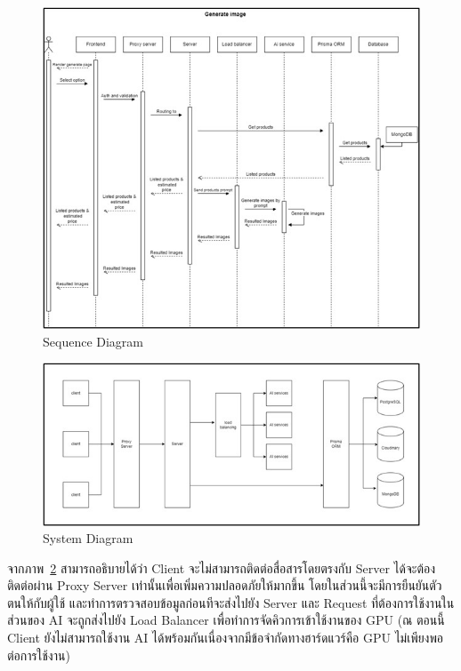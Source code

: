\documentclass[12pt,oneside,openright,a4paper]{cpe-thai-project}
\begin{document}
\begin{figure}[!h]\centering
\includegraphics{image/sequence.jpg}
\caption{Sequence Diagram}
\label{fig:sequence}
\end{figure}

\vspace{\fill}\clearpage

\begin{figure}[!h]\centering
\includegraphics{image/system.jpg}
\caption{System Diagram}
\label{fig:system}
\end{figure}

\hspace {18pt}จากภาพ~\ref{fig:system} สามารถอธิบายได้ว่า Client จะไม่สามารถติดต่อสื่อสารโดยตรงกับ Server ได้จะต้องติดต่อผ่าน Proxy Server เท่านั้นเพื่อเพิ่มความปลอดภัยให้มากขึ้น โดยในส่วนนี้จะมีการยืนยันตัวตนให้กับผู้ใช้ และทำการตรวจสอบข้อมูลก่อนทีจะส่งไปยัง Server และ Request ที่ต้องการใช้งานในส่วนของ AI จะถูกส่งไปยัง Load Balancer เพื่อทำการจัดคิวการเข้าใช้งานของ GPU (ณ ตอนนี้ Client ยังไม่สามารถใช้งาน AI ได้พร้อมกันเนื่องจากมีข้อจำกัดทางฮาร์ดแวร์คือ GPU ไม่เพียงพอต่อการใช้งาน) 
\end{document}
